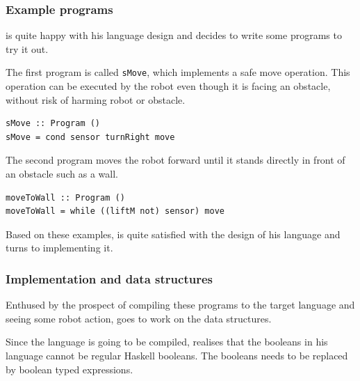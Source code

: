 \subsubsection{Example programs}

\studname{} is quite happy with his language design and decides to
write some programs to try it out.

The first program is called {\tt sMove}, which implements a safe move 
operation. This operation can be executed by the robot even though it is facing 
an obstacle, without risk of harming robot or obstacle. 

\begin{small} 
\begin{verbatim}
sMove :: Program () 
sMove = cond sensor turnRight move 
\end{verbatim}
\end{small}  

The second program moves the robot forward until it stands directly 
in front of an obstacle such as a wall. 

\begin{small} 
\begin{verbatim}
moveToWall :: Program () 
moveToWall = while ((liftM not) sensor) move
\end{verbatim}
\end{small}  

Based on these examples, \studname{} is quite satisfied with the design of his
language and turns to implementing it.

\subsubsection{Implementation and data structures} 

Enthused by the prospect of compiling these programs to the target language and 
seeing some robot action, \studname{} goes to work on the data structures. 

Since the language is going to be compiled, \studname{} realises that the 
booleans in his language cannot be regular Haskell booleans. The booleans 
needs to be replaced by boolean typed expressions.

